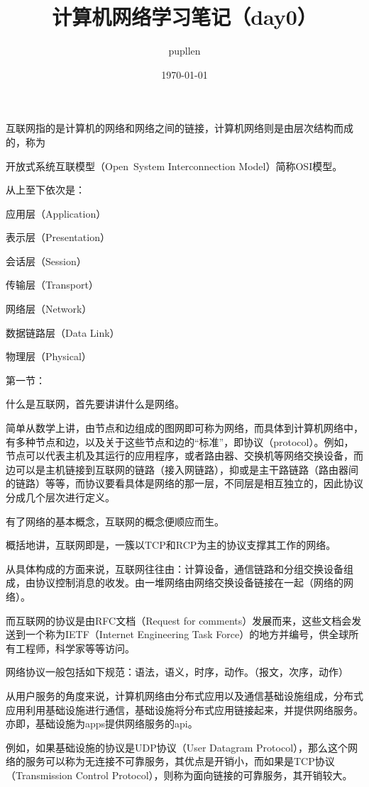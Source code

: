 \documentclass[fontset=windows]{article}
\title{\heiti\zihao{2} 计算机网络学习笔记（day0）}
\author{\songti pupllen}
\date{\today}
\begin{document}
	\maketitle
	互联网指的是计算机的网络和网络之间的链接，计算机网络则是由层次结构而成的，称为

	开放式系统互联模型（Open System Interconnection Model）简称OSI模型。
	
	从上至下依次是：
	
	应用层（Application）
	
	表示层（Presentation）
	
	会话层（Session）
	
	传输层（Transport）
	
	网络层（Network）
	
	数据链路层（Data Link）
	
	物理层（Physical）
	
	第一节：
	
	什么是互联网，首先要讲讲什么是网络。
	
	简单从数学上讲，由节点和边组成的图网即可称为网络，而具体到计算机网络中，有多种节点和边，以及关于这些节点和边的“标准”，即协议（protocol）。例如，节点可以代表主机及其运行的应用程序，或者路由器、交换机等网络交换设备，而边可以是主机链接到互联网的链路（接入网链路），抑或是主干路链路（路由器间的链路）等等，而协议要看具体是网络的那一层，不同层是相互独立的，因此协议分成几个层次进行定义。
	
	有了网络的基本概念，互联网的概念便顺应而生。
	
	概括地讲，互联网即是，一簇以TCP和RCP为主的协议支撑其工作的网络。
	
	从具体构成的方面来说，互联网往往由：计算设备，通信链路和分组交换设备组成，由协议控制消息的收发。由一堆网络由网络交换设备链接在一起（网络的网络）。
	
	而互联网的协议是由RFC文档（Request for comments）发展而来，这些文档会发送到一个称为IETF（Internet Engineering Task Force）的地方并编号，供全球所有工程师，科学家等等访问。
	
	网络协议一般包括如下规范：语法，语义，时序，动作。（报文，次序，动作）
	
	从用户服务的角度来说，计算机网络由分布式应用以及通信基础设施组成，分布式应用利用基础设施进行通信，基础设施将分布式应用链接起来，并提供网络服务。亦即，基础设施为apps提供网络服务的api。
	
	例如，如果基础设施的协议是UDP协议（User Datagram Protocol），那么这个网络的服务可以称为无连接不可靠服务，其优点是开销小，而如果是TCP协议（Transmission Control Protocol），则称为面向链接的可靠服务，其开销较大。
    
\end{document}
